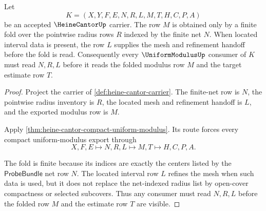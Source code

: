 \begin{theorem}
\label{thm:heine-cantor-finite-net-radius-fold}
Let
$$
K=(X,Y,F,E,N,R,L,M,T,H,C,P,A)
$$
be an accepted $\HeineCantorUp$ carrier. The row $M$ is obtained only by a finite fold over the pointwise radius rows $R$ indexed by the finite net $N$. When located interval data is present, the row $L$ supplies the mesh and refinement handoff before the fold is read. Consequently every $\UniformModulusUp$ consumer of $K$ must read $N,R,L$ before it reads the folded modulus row $M$ and the target estimate row $T$.
\end{theorem}
\begin{proof}
Project the carrier of \autoref{def:heine-cantor-carrier}. The finite-net row is $N$, the pointwise radius inventory is $R$, the located mesh and refinement handoff is $L$, and the exported modulus row is $M$.

Apply \autoref{thm:heine-cantor-compact-uniform-modulus}. Its route forces every compact uniform-modulus export through
$$
X,F,E \longmapsto N,R,L \longmapsto M,T \longmapsto H,C,P,A.
$$

The fold is finite because its indices are exactly the centers listed by the $\mathsf{ProbeBundle}$ net row $N$. The located interval row $L$ refines the mesh when such data is used, but it does not replace the net-indexed radius list by open-cover compactness or selected subcovers. Thus any consumer must read $N,R,L$ before the folded row $M$ and the estimate row $T$ are visible.
\end{proof}


